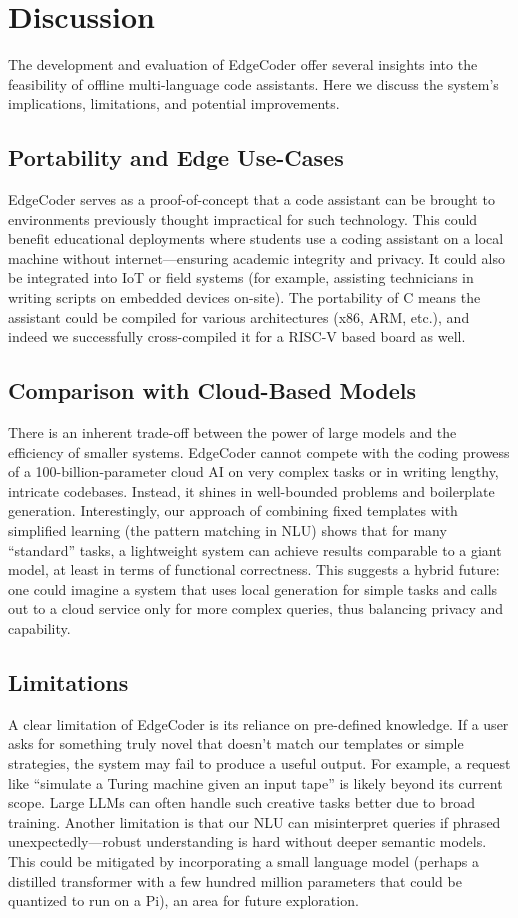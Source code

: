 \documentclass[12pt]{article}
\begin{document}
\section{Discussion}
\noindent 
The development and evaluation of EdgeCoder offer several insights into the feasibility of offline multi-language code assistants. Here we discuss the system’s implications, limitations, and potential improvements.

\subsection{Portability and Edge Use-Cases}
EdgeCoder serves as a proof-of-concept that a code assistant can be brought to environments previously thought impractical for such technology. This could benefit educational deployments where students use a coding assistant on a local machine without internet—ensuring academic integrity and privacy. It could also be integrated into IoT or field systems (for example, assisting technicians in writing scripts on embedded devices on-site). The portability of C means the assistant could be compiled for various architectures (x86, ARM, etc.), and indeed we successfully cross-compiled it for a RISC-V based board as well.

\subsection{Comparison with Cloud-Based Models}
There is an inherent trade-off between the power of large models and the efficiency of smaller systems. EdgeCoder cannot compete with the coding prowess of a 100-billion-parameter cloud AI on very complex tasks or in writing lengthy, intricate codebases. Instead, it shines in well-bounded problems and boilerplate generation. Interestingly, our approach of combining fixed templates with simplified learning (the pattern matching in NLU) shows that for many “standard” tasks, a lightweight system can achieve results comparable to a giant model, at least in terms of functional correctness. This suggests a hybrid future: one could imagine a system that uses local generation for simple tasks and calls out to a cloud service only for more complex queries, thus balancing privacy and capability.

\subsection{Limitations}
A clear limitation of EdgeCoder is its reliance on pre-defined knowledge. If a user asks for something truly novel that doesn’t match our templates or simple strategies, the system may fail to produce a useful output. For example, a request like “simulate a Turing machine given an input tape” is likely beyond its current scope. Large LLMs can often handle such creative tasks better due to broad training. Another limitation is that our NLU can misinterpret queries if phrased unexpectedly—robust understanding is hard without deeper semantic models. This could be mitigated by incorporating a small language model (perhaps a distilled transformer with a few hundred million parameters that could be quantized to run on a Pi), an area for future exploration.
\end{document}
